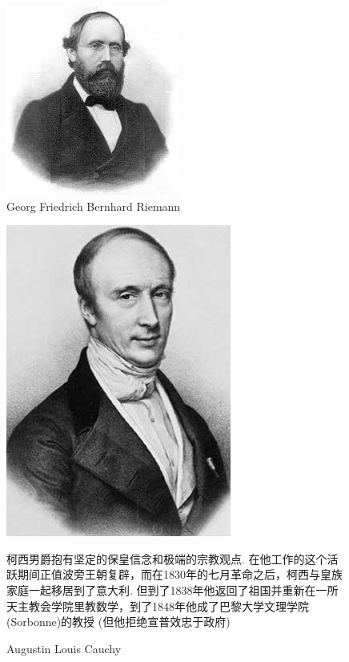 \documentclass[14pt,reqno]{amsart}
\numberwithin{equation}{section}
\begin{document}
	\begin{figure}
	\centering
	\includegraphics{Riemann.jpeg}
	\caption{Georg Friedrich Bernhard Riemann}
\end{figure} 
\begin{figure}
	\includegraphics{Augustin-Louis_Cauchy_1901.jpg}
	\caption{Augustin Louis Cauchy}
柯西男爵抱有坚定的保皇信念和极端的宗教观点. 在他工作的这个活跃期间正值波旁王朝复辟，而在1830年的七月革命之后，柯西与皇族家庭一起移居到了意大利. 但到了1838年他返回了祖国并重新在一所天主教会学院里教数学，到了1848年他成了巴黎大学文理学院 (Sorbonne)的教授 (但他拒绝宣普效忠于政府)
\end{figure} 
\end{document}
